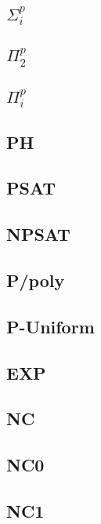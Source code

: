 \documentclass[]{article}
\begin{document}
\subsection{$\Sigma^p_i$}

\subsection{$\Pi^p_2$}

\subsection{$\Pi^p_i$}

\subsection{PH}

\subsection{PSAT}

\subsection{NPSAT}

\subsection{P/poly}

\subsection{P-Uniform}

\subsection{EXP}

\subsection{NC}

\subsection{NC0}

\subsection{NC1}
\end{document}
